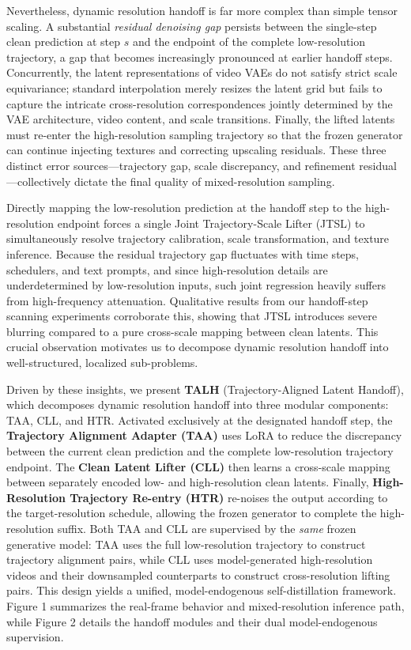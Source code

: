 Nevertheless, dynamic resolution handoff is far more complex than simple tensor scaling. A substantial \emph{residual denoising gap} persists between the single-step clean prediction at step \(s\) and the endpoint of the complete low-resolution trajectory, a gap that becomes increasingly pronounced at earlier handoff steps. Concurrently, the latent representations of video VAEs do not satisfy strict scale equivariance; standard interpolation merely resizes the latent grid but fails to capture the intricate cross-resolution correspondences jointly determined by the VAE architecture, video content, and scale transitions. Finally, the lifted latents must re-enter the high-resolution sampling trajectory so that the frozen generator can continue injecting textures and correcting upscaling residuals. These three distinct error sources---trajectory gap, scale discrepancy, and refinement residual---collectively dictate the final quality of mixed-resolution sampling.

Directly mapping the low-resolution prediction at the handoff step to the high-resolution endpoint forces a single Joint Trajectory-Scale Lifter (JTSL) to simultaneously resolve trajectory calibration, scale transformation, and texture inference. Because the residual trajectory gap fluctuates with time steps, schedulers, and text prompts, and since high-resolution details are underdetermined by low-resolution inputs, such joint regression heavily suffers from high-frequency attenuation. Qualitative results from our handoff-step scanning experiments corroborate this, showing that JTSL introduces severe blurring compared to a pure cross-scale mapping between clean latents. This crucial observation motivates us to decompose dynamic resolution handoff into well-structured, localized sub-problems.

Driven by these insights, we present \textbf{TALH} (Trajectory-Aligned Latent Handoff), which decomposes dynamic resolution handoff into three modular components: TAA, CLL, and HTR. Activated exclusively at the designated handoff step, the \textbf{Trajectory Alignment Adapter (TAA)} uses LoRA to reduce the discrepancy between the current clean prediction and the complete low-resolution trajectory endpoint. The \textbf{Clean Latent Lifter (CLL)} then learns a cross-scale mapping between separately encoded low- and high-resolution clean latents. Finally, \textbf{High-Resolution Trajectory Re-entry (HTR)} re-noises the output according to the target-resolution schedule, allowing the frozen generator to complete the high-resolution suffix. Both TAA and CLL are supervised by the \emph{same} frozen generative model: TAA uses the full low-resolution trajectory to construct trajectory alignment pairs, while CLL uses model-generated high-resolution videos and their downsampled counterparts to construct cross-resolution lifting pairs. This design yields a unified, model-endogenous self-distillation framework. Figure 1 summarizes the real-frame behavior and mixed-resolution inference path, while Figure 2 details the handoff modules and their dual model-endogenous supervision.

